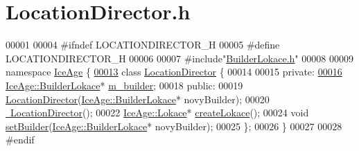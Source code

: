 \hypertarget{LocationDirector_8h_source}{}\section{Location\+Director.\+h}
\label{LocationDirector_8h_source}

\begin{DoxyCode}
00001 
00004 \textcolor{preprocessor}{#ifndef LOCATIONDIRECTOR\_H}
00005 \textcolor{preprocessor}{#define LOCATIONDIRECTOR\_H}
00006 
00007 \textcolor{preprocessor}{#include"\hyperlink{BuilderLokace_8h}{BuilderLokace.h}"}
00008 
00009 \textcolor{keyword}{namespace }\hyperlink{namespaceIceAge}{IceAge} \{
\hypertarget{LocationDirector_8h_source.tex_l00013}{}\hyperlink{classIceAge_1_1LocationDirector}{00013}     \textcolor{keyword}{class }\hyperlink{classIceAge_1_1LocationDirector}{LocationDirector} \{
00014 
00015     \textcolor{keyword}{private}:
\hypertarget{LocationDirector_8h_source.tex_l00016}{}\hyperlink{classIceAge_1_1LocationDirector_a304bfc5b7f4989c6ef61e5556e2e7329}{00016}         \hyperlink{classIceAge_1_1BuilderLokace}{IceAge::BuilderLokace}* \hyperlink{classIceAge_1_1LocationDirector_a304bfc5b7f4989c6ef61e5556e2e7329}{m\_builder};
00018     \textcolor{keyword}{public}:
00019         \hyperlink{classIceAge_1_1LocationDirector_a1b9d26b132d924914da5a760932ee64d}{LocationDirector}(\hyperlink{classIceAge_1_1BuilderLokace}{IceAge::BuilderLokace}* novyBuilder);
00020         \hyperlink{classIceAge_1_1LocationDirector_a86ed70087306617e26540277f692ef68}{~LocationDirector}();
00022         \hyperlink{classIceAge_1_1Lokace}{IceAge::Lokace}* \hyperlink{classIceAge_1_1LocationDirector_aaf149e550266d7934d8f227a0ec67953}{createLokace}(); 
00024         \textcolor{keywordtype}{void} \hyperlink{classIceAge_1_1LocationDirector_ab9e7a61fc4e2860e674c7daa60d60bb3}{setBuilder}(\hyperlink{classIceAge_1_1BuilderLokace}{IceAge::BuilderLokace}* novyBuilder); 
00025     \};
00026 \}
00027 
00028 \textcolor{preprocessor}{#endif}
\end{DoxyCode}
